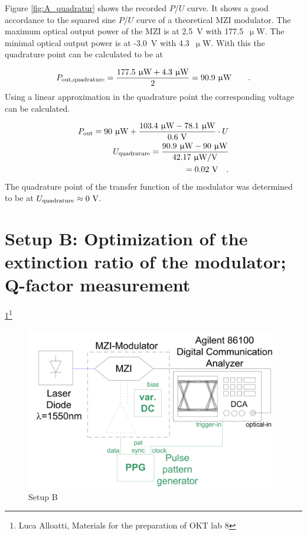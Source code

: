 Figure \ref{fig:A_quadratur} shows the recorded $P$/$U$ curve. It shows a good accordance to the squared sine $P$/$U$ curve of a theoretical MZI modulator.
The maximum optical output power of the MZI is at 2.5~V with 177.5~$\upmu$W. The minimal optical output power is at -3.0~V with 4.3~$\upmu$W. With this the quadrature point can be calculated to be at

\begin{equation}
P_{\mathrm{out,quadrature}}=\frac{177.5~\upmu \mathrm{W}+4.3~\upmu \mathrm{W}}{2}=90.9~\upmu \mathrm{W}\qquad.
\label{eq:}
\end{equation} 
Using a linear approximation in the quadrature point the corresponding voltage can be calculated.

\begin{equation}
\begin{split}
P_{\mathrm{out}}=90~\upmu \mathrm{W} + \frac{103.4~\upmu \mathrm{W}- 78.1~\upmu \mathrm{W}}{0.6~\mathrm{V}}\cdot U\\
U_{\mathrm{quadrature}}=\frac{90.9~\upmu \mathrm{W}-90~\upmu \mathrm{W}}{42.17~\upmu \mathrm{W}/\mathrm{V}}\\
=0.02~\mathrm{V} \quad.
\end{split}
\label{eq:}
\end{equation}
The quadrature point of the transfer function of the modulator was determined to be at $U_{\mathrm{quadrature}}\approx 0~\mathrm{V}$.


\section{Setup B: Optimization of the extinction ratio of the modulator; Q-factor measurement}


\ref{fig:B_setup}\footnote[3]{Luca Alloatti, Materials for the preparation of OKT lab 8}


\begin{figure}%
\centering
\includegraphics[width=.6\columnwidth]{Grafiken/B_setup.png}%
\caption{Setup B}%
\label{fig:B_setup}%
\end{figure} 